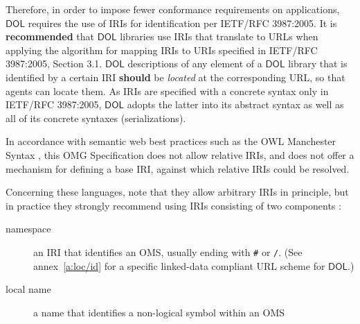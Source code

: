 \documentclass[10pt,fleqn,final]{scrreprt}
\makeatletter
\newcommand*\CommentAuthor{}
\renewcommand*\CommentAuthor{#1}}
\newcommand*\CommentDate{}
\renewcommand*\CommentDate{#1}}
\newcommand*\CommentId{}
\renewcommand*\CommentId{#1}}
\newcommand*\CommentType{}
\renewcommand*\CommentType{#1}}
\newcommand*{\SetCommentColorByType}[1]{%
\edef\localType{{#1}}%
\expandafter\ifstrequal\localType{q-aut}{\colorlet{CommentColor}{red}}{%
\expandafter\ifstrequal\localType{q-all}{\colorlet{CommentColor}{orange}}{%
\expandafter\ifstrequal\localType{todo}{\colorlet{CommentColor}{orange}}{%
\expandafter\ifstrequal\localType{fyi}{\colorlet{CommentColor}{lightgray}}{%
\colorlet{CommentColor}{yellow}}}}}}
\newcommand*{\SetCommentPrefixByType}[1]{%
\edef\localType{{#1}}%
\expandafter\@ifmtarg\localType{%
\edef\CommentPrefix{}%
}{%
\caseupper[q]{#1}%
\edef\CommentPrefix{\thestring: }%
}}
\newcommand*{\initComment}[1]{%
\setkeys{Comment}{#1}%
\SetCommentColorByType{\CommentType}%
\relax%
\SetCommentPrefixByType{\CommentType}%
\relax%
}
\newcommand*{\todonote}[2][]{%
\initComment{#1}%
\pdfcomment[author=\CommentAuthor,color=CommentColor,date=\CommentDate,id=\CommentId]{%
\CommentPrefix
#2}}
\renewcommand*{\todonote}[2][]{%
\initComment{#1}%
\ednote{\CommentPrefix #2}}
\newcommand*{\CLnote}[2][author=Christoph Lange]{%
\todonote[author=Christoph Lange,#1]{#2} 
}
\newcommand*{\syntax}[1]{\texttt{#1}}
\newcommand*{\recommended}{\textbf{recommended}\xspace}
\newcommand*{\should}{\textbf{should}\xspace}
\newcommand*{\IS}{OMG Specification\xspace}
\newcommand*{\DOL}{\ensuremath{\mathsf{DOL}}\xspace}
\newcommand{\nisref}[1]{#1}
\newenvironment{definitions}[0]{\medskip }{}
\makeatother
\begin{document}
\begin{definitions}
Therefore, in order to impose fewer conformance requirements on applications, \DOL requires the use of
 IRIs for identification per \nisref{IETF/RFC 3987:2005}.
  It is \recommended that \DOL libraries use 
IRIs that translate to URLs when applying the algorithm for mapping IRIs to URIs specified in 
\nisref{IETF/RFC 3987:2005, Section 3.1}.  \DOL descriptions of any element of a \DOL library that is 
identified by a certain IRI \should be \emph{located} at the corresponding URL, so that agents can 
locate them.  As IRIs are specified with a concrete syntax only in \nisref{IETF/RFC 3987:2005}, \DOL 
adopts the latter into its abstract syntax as well as all of its concrete syntaxes 
(serializations).



In accordance with semantic web best practices such as the OWL Manchester Syntax 
\cite{W3C:NOTE-owl2-manchester-syntax-20091027}, this \IS does not allow relative IRIs, and does 
not offer a mechanism for defining a base IRI, against which relative IRIs could be resolved.

Concerning these languages, note that they allow arbitrary IRIs in principle, but in practice they 
strongly recommend using IRIs consisting of two components \cite{W3C:NOTE-swbp-vocab-pub-20080828}:
\begin{description}
\item[namespace] an IRI that identifies an OMS,
usually ending with \syntax{\#} or \syntax{/}. ({See annex~\ref{a:loc/id} for a specific linked-data compliant URL scheme for \DOL.})
\item[local name] a name that identifies a non-logical symbol within an OMS
\end{description}


\end{definitions}
\end{document}
